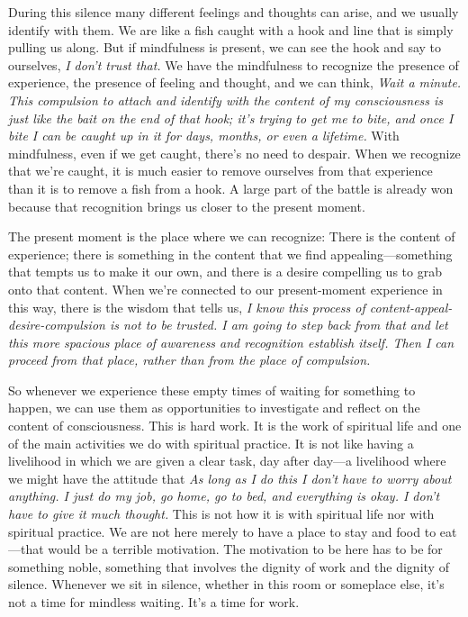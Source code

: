 During this silence many different feelings and thoughts can arise, and 
we usually identify with them. We are like a fish caught with a hook 
and line that is simply pulling us along. But if mindfulness is 
present, we can see the hook and say to ourselves, \emph{I don't trust 
that.} We have the mindfulness to recognize the presence of experience, 
the presence of feeling and thought, and we can think, \emph{Wait a 
minute. This compulsion to attach and identify with the content of my 
consciousness is just like the bait on the end of that hook; it's 
trying to get me to bite, and once I bite I can be caught up in it for 
days, months, or even a lifetime.} With mindfulness, even if we get 
caught, there's no need to despair. When we recognize that we're 
caught, it is much easier to remove ourselves from that experience than 
it is to remove a fish from a hook. A large part of the battle is 
already won because that recognition brings us closer to the present 
moment.

The present moment is the place where we can recognize: There is the 
content of experience; there is something in the content that we find 
appealing---something that tempts us to make it our own, and there is a 
desire compelling us to grab onto that content. When we're connected to 
our present-moment experience in this way, there is the wisdom that 
tells us, \emph{I know this process of content-appeal-desire-compulsion 
is not to be trusted. I am going to step back from that and let this 
more spacious place of awareness and recognition establish itself. Then 
I can proceed from that place, rather than from the place of 
compulsion.}

So whenever we experience these empty times of waiting for something to 
happen, we can use them as opportunities to investigate and reflect on 
the content of consciousness. This is hard work. It is the work of 
spiritual life and one of the main activities we do with spiritual 
practice. It is not like having a livelihood in which we are given a 
clear task, day after day---a livelihood where we might have the 
attitude that \emph{As long as I do this I don't have to worry about 
anything. I just do my job, go home, go to bed, and everything is okay. 
I don't have to give it much thought.} This is not how it is with 
spiritual life nor with spiritual practice. We are not here merely to 
have a place to stay and food to eat---that would be a terrible 
motivation. The motivation to be here has to be for something noble, 
something that involves the dignity of work and the dignity of silence. 
Whenever we sit in silence, whether in this room or someplace else, 
it's not a time for mindless waiting. It's a time for work.

